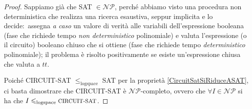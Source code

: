 \begin{proof}

    Sappiamo già che {\footnotesize SAT} $\in \mathcal{NP}$, perché abbiamo visto una procedura non deterministica che realizza una ricerca esaustiva, seppur implicita e lo decide:\ assegna \textit{a caso} un valore di verità alle variabili dell'espressione booleana (fase che richiede tempo \textit{non deterministico} polinomiale) e valuta l'espressione (o il circuito) booleano chiuso che si ottiene (fase che richiede tempo \textit{deterministico} polinomiale); il problema è risolto positivamente se esiste un'espressione chiusa che valuta a $\mathit{tt}$.\

    Poiché {\footnotesize CIRCUIT-SAT} $\leqslant_{\mathrm{logspace}}$ {\footnotesize SAT} per la proprietà \ref{CircuitSatSiRiduceASAT}, ci basta dimostrare che {\footnotesize CIRCUIT-SAT} è $\mathcal{NP}$-completo, ovvero che $\forall I \in \mathcal{NP}$ si ha che $I \leqslant_{\mathrm{logspace}} \mbox{\footnotesize CIRCUIT-SAT}$.


\end{proof}
